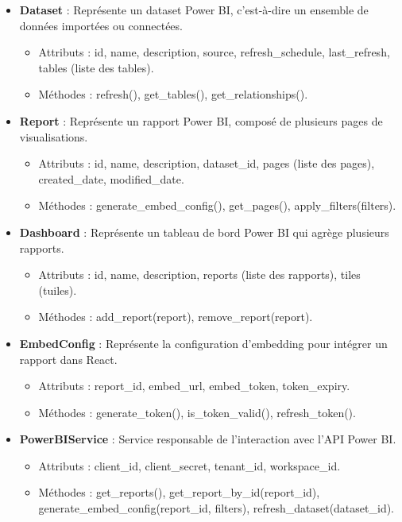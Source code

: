 \begin{itemize}
    \item \textbf{Dataset} : Représente un dataset Power BI, c'est-à-dire un ensemble de données importées ou connectées.
        \begin{itemize}
            \item Attributs : id, name, description, source, refresh\_schedule, last\_refresh, tables (liste des tables).
            \item Méthodes : refresh(), get\_tables(), get\_relationships().
        \end{itemize}
    
    \item \textbf{Report} : Représente un rapport Power BI, composé de plusieurs pages de visualisations.
        \begin{itemize}
            \item Attributs : id, name, description, dataset\_id, pages (liste des pages), created\_date, modified\_date.
            \item Méthodes : generate\_embed\_config(), get\_pages(), apply\_filters(filters).
        \end{itemize}
    
    \item \textbf{Dashboard} : Représente un tableau de bord Power BI qui agrège plusieurs rapports.
        \begin{itemize}
            \item Attributs : id, name, description, reports (liste des rapports), tiles (tuiles).
            \item Méthodes : add\_report(report), remove\_report(report).
        \end{itemize}
    
    \item \textbf{EmbedConfig} : Représente la configuration d'embedding pour intégrer un rapport dans React.
        \begin{itemize}
            \item Attributs : report\_id, embed\_url, embed\_token, token\_expiry.
            \item Méthodes : generate\_token(), is\_token\_valid(), refresh\_token().
        \end{itemize}
    
    \item \textbf{PowerBIService} : Service responsable de l'interaction avec l'API Power BI.
        \begin{itemize}
            \item Attributs : client\_id, client\_secret, tenant\_id, workspace\_id.
            \item Méthodes : get\_reports(), get\_report\_by\_id(report\_id), generate\_embed\_config(report\_id, filters), refresh\_dataset(dataset\_id).
        \end{itemize}
    

\end{itemize}
